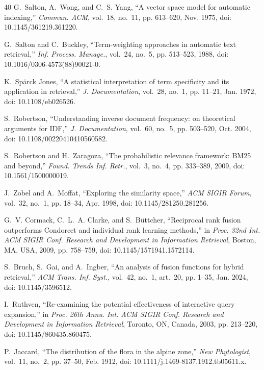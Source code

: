 \documentclass[journal,twoside,web]{ieeecolor}
\begin{document}
\begin{thebibliography}{40}
G.~Salton, A.~Wong, and C.~S. Yang, ``A vector space model for automatic
indexing,'' \emph{Commun. ACM}, vol.~18, no.~11, pp. 613--620, Nov. 1975,
doi: 10.1145/361219.361220.

G.~Salton and C.~Buckley, ``Term-weighting approaches in automatic text
retrieval,'' \emph{Inf. Process. Manage.}, vol.~24, no.~5, pp. 513--523, 1988,
doi: 10.1016/0306-4573(88)90021-0.

K.~Sp\"{a}rck Jones, ``A statistical interpretation of term specificity and its
application in retrieval,'' \emph{J. Documentation}, vol.~28, no.~1, pp. 11--21,
Jan. 1972, doi: 10.1108/eb026526.

S.~Robertson, ``Understanding inverse document frequency: on theoretical
arguments for IDF,'' \emph{J. Documentation}, vol.~60, no.~5, pp. 503--520,
Oct. 2004, doi: 10.1108/00220410410560582.

S.~Robertson and H.~Zaragoza, ``The probabilistic relevance framework: BM25 and
beyond,'' \emph{Found. Trends Inf. Retr.}, vol.~3, no.~4, pp. 333--389, 2009,
doi: 10.1561/1500000019.

J.~Zobel and A.~Moffat, ``Exploring the similarity space,''
\emph{ACM SIGIR Forum}, vol.~32, no.~1, pp. 18--34, Apr. 1998,
doi: 10.1145/281250.281256.

G.~V. Cormack, C.~L.~A. Clarke, and S.~B\"{u}ttcher, ``Reciprocal rank fusion
outperforms Condorcet and individual rank learning methods,'' in \emph{Proc.
32nd Int. ACM SIGIR Conf. Research and Development in Information Retrieval},
Boston, MA, USA, 2009, pp. 758--759, doi: 10.1145/1571941.1572114.

S.~Bruch, S.~Gai, and A.~Ingber, ``An analysis of fusion functions for hybrid
retrieval,'' \emph{ACM Trans. Inf. Syst.}, vol.~42, no.~1, art.~20, pp. 1--35,
Jan. 2024, doi: 10.1145/3596512.

I.~Ruthven, ``Re-examining the potential effectiveness of interactive query
expansion,'' in \emph{Proc. 26th Annu. Int. ACM SIGIR Conf. Research and
Development in Information Retrieval}, Toronto, ON, Canada, 2003, pp. 213--220,
doi: 10.1145/860435.860475.

P.~Jaccard, ``The distribution of the flora in the alpine zone,''
\emph{New Phytologist}, vol.~11, no.~2, pp. 37--50, Feb. 1912,
doi: 10.1111/j.1469-8137.1912.tb05611.x.


\end{thebibliography}
\end{document}
